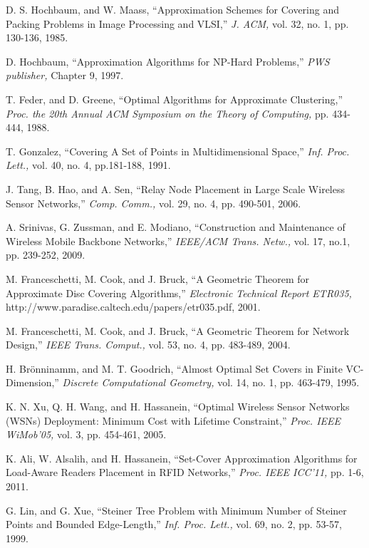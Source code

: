 \documentclass[journal]{IEEEtran}
\begin{document}
\begin{thebibliography}{1}
D. S. Hochbaum, and W. Maass, ``Approximation Schemes for Covering and Packing Problems in Image Processing and VLSI,''
{\it J. ACM,} vol. 32, no. 1, pp. 130-136, 1985.

D. Hochbaum, ``Approximation Algorithms for NP-Hard Problems,'' {\it PWS publisher,} Chapter 9, 1997.

T. Feder, and D. Greene, ``Optimal Algorithms for Approximate Clustering,'' {\it Proc. the
20th Annual ACM Symposium on the Theory of Computing,} pp. 434-444, 1988.

T. Gonzalez, ``Covering A Set of Points in Multidimensional Space,'' {\it Inf. Proc. Lett.,} vol. 40,
no. 4, pp.181-188, 1991.

J. Tang, B. Hao, and A. Sen, ``Relay Node Placement in Large Scale Wireless Sensor Networks,''
{\it Comp. Comm.,} vol. 29, no. 4, pp. 490-501, 2006.

A. Srinivas, G. Zussman, and E. Modiano, ``Construction and Maintenance of Wireless Mobile Backbone
Networks,'' {\it IEEE/ACM Trans. Netw.,} vol. 17, no.1, pp. 239-252, 2009.

M. Franceschetti, M. Cook, and J. Bruck, ``A Geometric Theorem for Approximate Disc Covering Algorithms,''
{\it Electronic Technical Report ETR035,} http://www.paradise.caltech.edu/papers/etr035.pdf, 2001.

M. Franceschetti, M. Cook, and J. Bruck, ``A Geometric Theorem for Network Design,'' {\it IEEE Trans. Comput.,}
vol. 53, no. 4, pp. 483-489, 2004.

H. Br\"{o}nninamm, and M. T. Goodrich, ``Almost Optimal Set Covers in Finite VC-Dimension,'' {\it Discrete
Computational Geometry,} vol. 14, no. 1, pp. 463-479, 1995.

K. N. Xu, Q. H. Wang, and H. Hassanein, ``Optimal Wireless Sensor Networks (WSNs) Deployment:
Minimum Cost with Lifetime Constraint,'' {\it Proc. IEEE WiMob'05,} vol. 3, pp. 454-461, 2005.

K. Ali, W. Alsalih, and H. Hassanein, ``Set-Cover Approximation Algorithms for Load-Aware Readers Placement in
RFID Networks,'' {\it Proc. IEEE ICC'11,} pp. 1-6, 2011.

G. Lin, and G. Xue, ``Steiner Tree Problem with Minimum Number of Steiner Points and Bounded Edge-Length,''
{\it Inf. Proc. Lett.,} vol. 69, no. 2, pp. 53-57, 1999.


\end{thebibliography}
\end{document}
